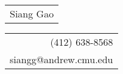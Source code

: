 {\Huge\bfseries\begin{tabular}[c]{l}
    Siang Gao
\end{tabular}}\hfill%
{\begin{tabular}[c]{r}
    (412) 638-8568\\
    siangg@andrew.cmu.edu%
\end{tabular}}